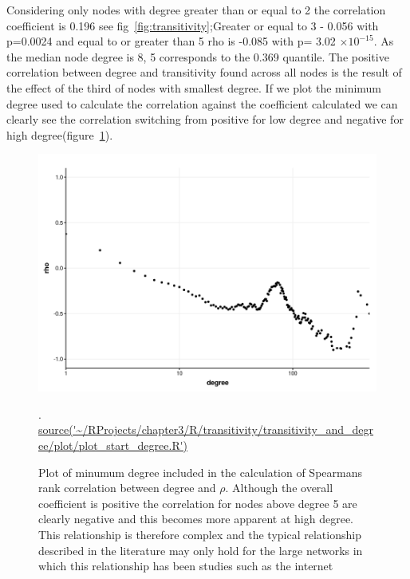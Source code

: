 Considering only nodes with degree greater than or equal to 2 the correlation coefficient is 0.196 see fig~\ref{fig:transitivity};Greater or equal to 3 - 0.056 with p=0.0024 and equal to or greater than 5 rho is -0.085 with p= 3.02 $\times 10^{-15}$. As the median node degree is 8, 5 corresponds to the 0.369 quantile. The positive correlation between degree and transitivity found across all nodes is the result of the effect of the third of nodes with smallest degree. If we plot the minimum degree used to calculate the correlation against the coefficient calculated we can clearly see the correlation switching from positive for low degree and negative for high degree(figure~\ref{fig:Plot of minumum degree included in the calculation of Spearmans rank correlation between degree and rho}).

\begin{figure}
    \centering
    \includegraphics[width=\textwidth]{images/chapter3/ggplot2/degree_and_transitivity/Rplot_rho_and_starting_degree_transitivity.png}
    \caption{Plot of minumum degree included in the calculation of Spearmans rank correlation between degree and $\rho$. Although the overall coefficient is positive the correlation for nodes above degree 5 are clearly negative and this becomes more apparent at high degree. This relationship is therefore complex and the typical relationship described in the literature may only hold for the large networks in which this relationship has been studies such as the internet}.
    \tiny\url{source('~/RProjects/chapter3/R/transitivity/transitivity_and_degree/plot/plot_start_degree.R')}
    \label{fig:Plot of minumum degree included in the calculation of Spearmans rank correlation between degree and rho}
\end{figure}

